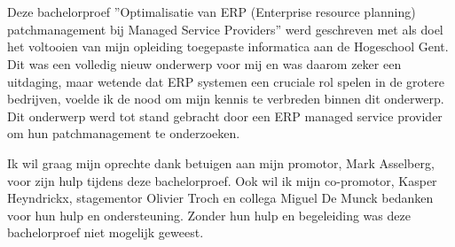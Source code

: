 
\chapter*{}%
\label{ch:voorwoord}



Deze bachelorproef ”Optimalisatie van ERP (Enterprise resource planning)
patchmanagement bij Managed Service Providers” werd geschreven met
als doel het voltooien van mijn opleiding toegepaste informatica aan de Hogeschool Gent.
Dit was een volledig nieuw onderwerp voor mij en was daarom zeker een uitdaging, maar wetende dat ERP systemen een cruciale rol spelen in de grotere bedrijven, voelde ik de nood om mijn kennis te verbreden binnen dit onderwerp. Dit onderwerp werd tot stand gebracht door een ERP managed service provider om hun patchmanagement te onderzoeken.

Ik wil graag mijn oprechte dank betuigen aan mijn promotor, Mark Asselberg, voor zijn hulp tijdens deze bachelorproef. Ook wil ik mijn co-promotor, Kasper Heyndrickx, stagementor Olivier Troch en collega Miguel De Munck bedanken voor hun hulp en ondersteuning. Zonder hun hulp en begeleiding was deze bachelorproef niet mogelijk geweest.